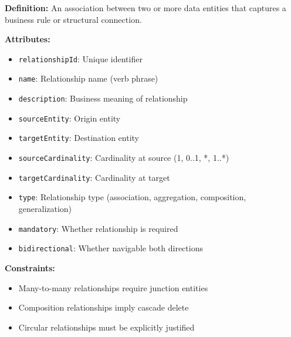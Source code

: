 \documentclass[11pt,letterpaper]{article}
\begin{document}
\begin{definitionbox}
\textbf{Definition:} An association between two or more data entities that captures a business rule or structural connection.

\textbf{Attributes:}
\begin{itemize}[nosep]
    \item \texttt{relationshipId}: Unique identifier
    \item \texttt{name}: Relationship name (verb phrase)
    \item \texttt{description}: Business meaning of relationship
    \item \texttt{sourceEntity}: Origin entity
    \item \texttt{targetEntity}: Destination entity
    \item \texttt{sourceCardinality}: Cardinality at source (1, 0..1, *, 1..*)
    \item \texttt{targetCardinality}: Cardinality at target
    \item \texttt{type}: Relationship type (association, aggregation, composition, generalization)
    \item \texttt{mandatory}: Whether relationship is required
    \item \texttt{bidirectional}: Whether navigable both directions
\end{itemize}

\textbf{Constraints:}
\begin{itemize}[nosep]
    \item Many-to-many relationships require junction entities
    \item Composition relationships imply cascade delete
    \item Circular relationships must be explicitly justified
\end{itemize}
\end{definitionbox}
\end{document}
